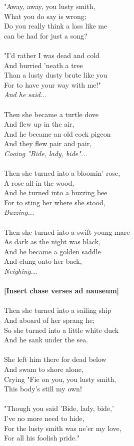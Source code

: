 \documentclass[twoside,13pt,openany,letterpaper]{memoir}%
\begin{document}
\begin{multicols}{2}[
]
"Away, away, you lusty smith,\\
What you do say is wrong;\\
Do you really think a lass like me\\
can be had for just a song?\\
\\
"I'd rather I was dead and cold\\
And burried 'neath a tree\\
Than a lusty dusty brute like you\\
For to have your way with me!"\\
\textit{And he said...}\\
\\
Then she became a turtle dove\\
And flew up in the air,\\
And he became an old cock pigeon\\
And they flew pair and pair,\\
\textit{Cooing "Bide, lady, bide"...}\\
\\
Then she turned into a bloomin' rose,\\
A rose all in the wood, \\
And he turned into a buzzing bee\\
For to sting her where she stood,\\
\textit{Buzzing...}\\
\\
Then she turned into a swift young mare\\
As dark as the night was black,\\
And he became a golden saddle\\
And clung onto her back,\\
\textit{Neighing...}\\
\\
\textbf{[Insert chase verses ad nauseum]}\\
\\
Then she turned into a sailing ship\\
And aboard of her sprang he;\\
So she turned into a little white duck\\
And he sank under the sea.\\
\\
She left him there for dead below\\
And swam to shore alone,\\
Crying "Fie on you, you lusty smith,\\
This body's still my own!\\
\\
"Though you said 'Bide, lady, bide,'\\
I've no more need to hide,\\
For the lusty smith was ne'er my love,\\
For all his foolish pride."\\
\end{multicols}
\end{document}
